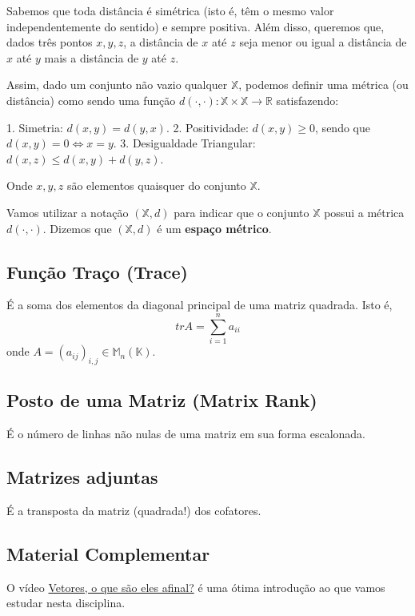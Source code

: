 \documentclass[12pt,a4paper]{article}
\begin{document}
Sabemos que toda distância é simétrica (isto é, têm o mesmo valor independentemente do sentido) e sempre positiva. Além disso, queremos que, dados três pontos $x, y, z$, a distância de $x$ até $z$ seja menor ou igual a distância de $x$ até $y$ mais a distância de $y$ até $z$.

Assim, dado um conjunto não vazio qualquer $\mathbb{X}$, podemos definir uma métrica (ou distância) como sendo uma função $d(\cdot , \cdot): \mathbb{X} \times \mathbb{X} \to \mathbb{R}$ satisfazendo:

1. Simetria: $d(x,y) = d(y,x)$.
2. Positividade: $d(x,y) \geq 0$, sendo que $d(x,y) = 0 \iff x = y$.
3. Desigualdade Triangular: $d(x,z) \leq d(x,y) + d(y,z)$.

Onde $x,y,z$ são elementos quaisquer do conjunto $\mathbb{X}$.

Vamos utilizar a notação $(\mathbb{X},d)$ para indicar que o conjunto $\mathbb{X}$ possui a métrica $d(\cdot , \cdot)$. Dizemos que $(\mathbb{X},d)$ é um \textbf{espaço métrico}.

\subsection{Função Traço (Trace)}

É a soma dos elementos da diagonal principal de uma matriz quadrada. Isto é,
$$
tr A = \sum_{i=1}^n {a_{ii}}
$$
onde $A = (a_{ij})_{i,j} \in \mathbb{M}_n(\mathbb{K})$.

\subsection{Posto de uma Matriz (Matrix Rank)}

É o número de linhas não nulas de uma matriz em sua forma escalonada.

\subsection{Matrizes adjuntas}

É a transposta da matriz (quadrada!) dos cofatores.

\subsection{Material Complementar}

O vídeo \href{https://www.youtube.com/watch?v=fNk_zzaMoSs&list=PLZHQObOWTQDPD3MizzM2xVFitgF8hE_ab&index=1}{Vetores, o que são eles afinal?} é uma ótima introdução ao que vamos estudar nesta disciplina.
\end{document}
